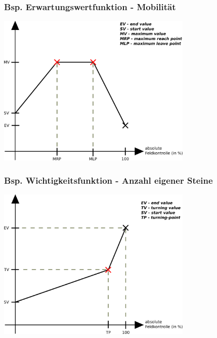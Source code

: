 \documentclass{beamer}
\begin{document}

\begin{frame}
\frametitle{Bsp. Erwartungswertfunktion - Mobilität}
\centering
\includegraphics[width = 0.7\textwidth]{ExpectedValueGraphEdited.pdf}
\end{frame}


\begin{frame}
\frametitle{Bsp. Wichtigkeitsfunktion - Anzahl eigener Steine}
\centering
\includegraphics[width = 0.7\textwidth]{ImportanceFunctionGraph.pdf}
\end{frame}

\end{document}
